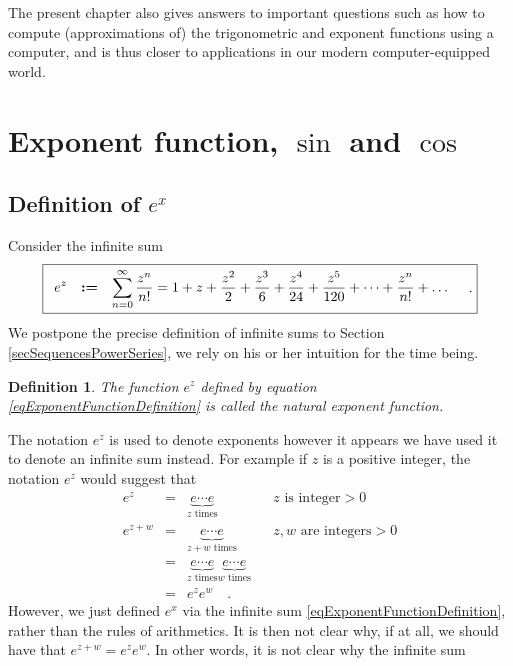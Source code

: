 \documentclass[12pt]{book}
\newcommand{\eqdef}{\textbf{:=}}
\newtheorem{definition}[theorem]{Definition}
\begin{document}
The present chapter also gives answers to important questions such as how to compute (approximations of) the trigonometric and exponent functions using a computer, and is thus closer to applications in our modern computer-equipped world. 





\section{Exponent function, $\sin$ and $\cos$}
\subsection{Definition of $e^x$}
Consider the infinite sum
\begin{equation}\boxed{\label{eqExponentFunctionDefinition}
\begin{array}{rcl}
\displaystyle e^{z}&\eqdef &\displaystyle \sum_{n=0}^{\infty} \frac{z^n}{n!} = 1+z+\frac{z^{2}}{2}+\frac{z^3}{6}+\frac{z^4}{24}+\frac{z^5}{120}+\dots+\frac{z^n}{n!}+\dots\\
\end{array} \quad .
}
\end{equation}
We postpone the precise definition of infinite sums to Section \ref{secSequencesPowerSeries}, we rely on his or her intuition for the time being.
\begin{definition}\label{defNaturalExponent}
 The function $e^z$ defined by equation \eqref{eqExponentFunctionDefinition} is called the natural exponent function.
\end{definition}
The notation $e^z$ is used to denote exponents however it appears we have used it to denote an infinite sum instead. For example if $z$ is a positive integer, the notation $e^z$ would suggest that 
\[
\begin{array}{rcll|l}
e^{z}&=& \underbrace{e\cdots e}_{z \text{ times} } && z\text{ is integer}>0\\
e^{z+w}&=&\underbrace{e \cdots e}_{z+w \text{ times} }&& z,w\text{ are integers}>0\\
&=&\underbrace{e\cdots  e}_{z \text{ times} }\underbrace{e\cdots  e}_{w \text{ times} }\\
&=& e^z e^w\quad .
\end{array}
\]
However, we just defined $e^x$ via the infinite sum \eqref{eqExponentFunctionDefinition}, rather than the rules of arithmetics. It is then not clear why, if at all, we should have that $e^{z+w}=e^{z}e^{w}$. In other words, it is not clear why the infinite sum
\end{document}
